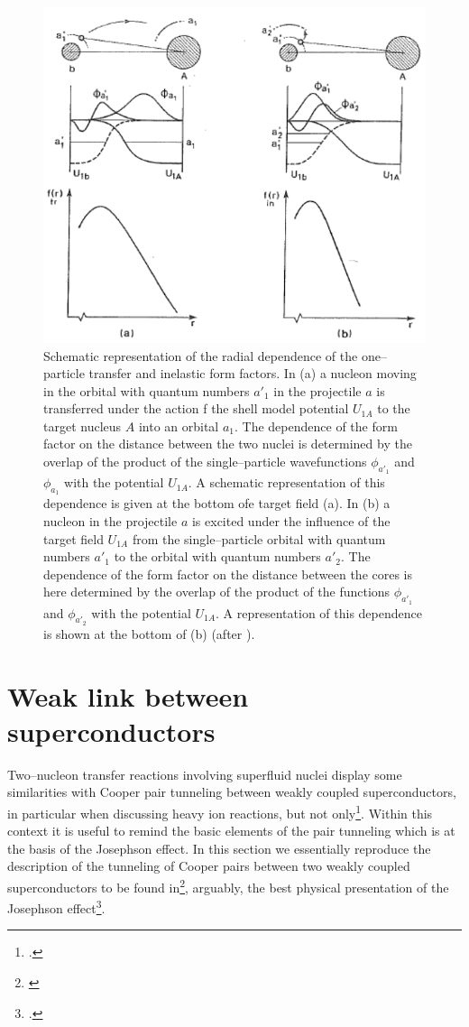 \begin{figure}
\centerline{\includegraphics*[width=\textwidth,angle=0.3]{nutshell/figs/fig2B3.pdf}}
\caption{Schematic representation of the radial dependence of the one--particle transfer and inelastic form factors. In (a) a nucleon moving in the orbital with quantum numbers $a'_1$ in the projectile $a$ is transferred under the action f the shell model potential $U_{1A}$ to the target nucleus $A$ into an orbital $a_1$. The dependence of the form factor on the distance between the two nuclei is determined by the overlap of the product of the single--particle wavefunctions $\phi_{a'_1}$ and $\phi_{a_1}$ with the potential $U_{1A}$. A schematic representation of this dependence is given at the bottom ofe target field  (a). In (b) a nucleon in the projectile $a$ is excited under the influence of the target field $U_{1A}$ from the single--particle orbital with quantum numbers $a'_1$ to the orbital with quantum numbers $a'_2$. The dependence of the form factor on the distance between the cores is here determined by the overlap of the product of the functions $\phi_{a'_1}$ and $\phi_{a'_2}$ with the potential $U_{1A}$. A representation of  this dependence is shown at the bottom of (b) (after \cite{Broglia:04a}).}\label{fig_4}
\end{figure}

\section{Weak link between superconductors}\label{C3AppC}
Two--nucleon transfer reactions involving superfluid nuclei display some similarities with Cooper pair tunneling between weakly coupled superconductors, in particular when discussing heavy ion reactions, but not only\footnote{\cite{vonOertzen:01,Oertzen:13,Broglia:04a}.}. Within this context it is useful to remind the basic elements of the pair tunneling which is at the basis of the Josephson effect. 
In this section we essentially reproduce the description of the tunneling of Cooper pairs between two weakly coupled superconductors to be found in\footnote{\cite{Anderson:64b}}, arguably, the best physical presentation of the Josephson effect\footnote{\cite{Josephson:62}.}.


